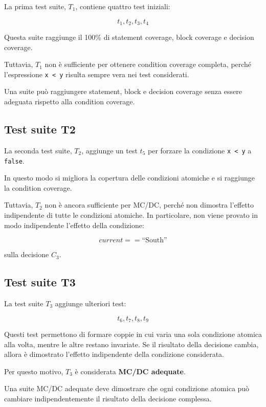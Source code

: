 La prima test suite, \(T_1\), contiene quattro test iniziali:

\[
t_1, t_2, t_3, t_4
\]

Questa suite raggiunge il 100\% di statement coverage, block coverage e decision coverage.

Tuttavia, \(T_1\) non è sufficiente per ottenere condition coverage completa, perché l'espressione \texttt{x < y} risulta sempre vera nei test considerati.

\begin{notaesame}
Una suite può raggiungere statement, block e decision coverage senza essere adeguata rispetto alla condition coverage.
\end{notaesame}

\subsection{Test suite T2}

La seconda test suite, \(T_2\), aggiunge un test \(t_5\) per forzare la condizione \texttt{x < y} a \texttt{false}.

In questo modo si migliora la copertura delle condizioni atomiche e si raggiunge la condition coverage.

Tuttavia, \(T_2\) non è ancora sufficiente per MC/DC, perché non dimostra l'effetto indipendente di tutte le condizioni atomiche. In particolare, non viene provato in modo indipendente l'effetto della condizione:

\[
current == \text{``South''}
\]

sulla decisione \(C_3\).

\subsection{Test suite T3}

La test suite \(T_3\) aggiunge ulteriori test:

\[
t_6, t_7, t_8, t_9
\]

Questi test permettono di formare coppie in cui varia una sola condizione atomica alla volta, mentre le altre restano invariate. Se il risultato della decisione cambia, allora è dimostrato l'effetto indipendente della condizione considerata.

Per questo motivo, \(T_3\) è considerata \textbf{MC/DC adequate}.

\begin{notaesame}
Una suite MC/DC adequate deve dimostrare che ogni condizione atomica può cambiare indipendentemente il risultato della decisione complessa.
\end{notaesame}

